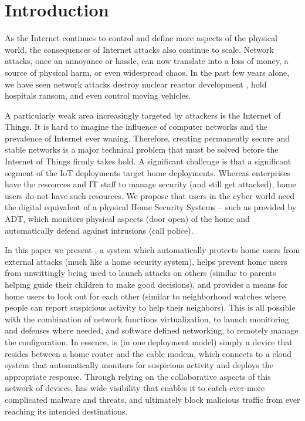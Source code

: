 \section{Introduction}
\label{sec:intro}

As the Internet continues to control and define more aspects of the physical world, the consequences of Internet attacks also continue to scale. Network attacks, once an annoyance or hassle, can now translate into a loss of money, a source of physical harm, or even widespread chaos. In the past few years alone, we have seen network attacks destroy nuclear reactor development \cite{stux}, hold hospitals ransom\cite{ransom}, and even control moving vehicles\cite{carhack}. 

A particularly weak area increasingly targeted by attackers is the Internet of Things. It is hard to imagine the influence of computer networks and the prevalence of Internet ever waning. Therefore, creating permanently secure and stable networks is a major technical problem that must be solved before the Internet of Things firmly takes hold. A significant challenge is that a significant segment of the IoT deployments target home deployments.  Whereas enterprises have the resources and IT staff to manage security (and still get attacked), home users do not have such resources.  We propose that users in the cyber world need the digital equivalent of a physical Home Security Systems -- such as provided by ADT, which monitors physical aspects (\eg door open) of the home and automatically defend against intrusions (\eg call police). 


In this paper we present \sysname, a system which automatically protects home users from external attacks (much like a home security system), helps prevent home users from unwittingly being used to launch attacks on others (similar to parents helping guide their children to make good decisions), and provides a means for home users to look out for each other (similar to neighborhood watches where people can report suspicious activity to help their neighbors).  This is all possible with the combination of network functions virtualization, to launch monitoring and defenses where needed, and software defined networking, to remotely manage the configuration.  In essence, \sysname is (in one deployment model) simply a device that resides between a home router and the cable modem, which connects to a cloud system that automatically monitors for suspicious activity and deploys the appropriate response.  Through relying on the collaborative aspects of this network of devices, \sysname has wide visibility that enables it to catch ever-more complicated malware and threats, and ultimately block malicious traffic from ever reaching its intended destinations. 

